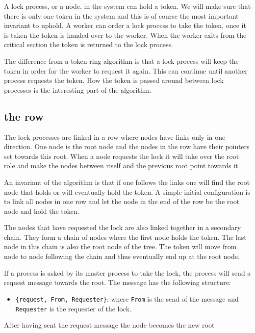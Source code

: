 \documentclass[a4paper, 11pt]{article}
\begin{document}
A lock process, or a node, in the system can hold a token. We will
make sure that there is only one token in the system and this is of
course the most important invariant to uphold. A worker can order a
lock process to take the token, once it is taken the token is handed
over to the worker. When the worker exits from the critical section
the token is returned to the lock process. 

The difference from a token-ring algorithm is that a lock process will
keep the token in order for the worker to request it again. This can
continue until another process requests the token. How the token is
passed around between lock processes is the interesting part of the
algorithm.

\subsection{the row}

The lock processes are linked in a row where nodes have links only in
one direction. One node is the root node and the nodes in the row have
their pointers set towards this root. When a node requests the lock it
will take over the root role and make the nodes between itself and
the previous root point towards it. 

An invariant of the algorithm is that if one follows the links one will 
find the root node that holds or will eventually hold the
token. A simple initial configuration is to link all nodes in one row
and let the node in the end of the row be the root node and hold the token.

The nodes that have requested the lock are also linked together in a
secondary chain. They form a chain of nodes where the first node holds
the token. The last node in this chain is also the root node of the
tree. The token will move from node to node following the chain and
thus eventually end up at the root node.

If a process is asked by its master process to take the lock, the process
will send a request message towards the root. The message has the
following structure:

\begin{itemize}
\item {\tt \{request, From, Requester\}}: where {\tt From} is the send
  of the message and {\tt Requester} is the requester of the lock.
\end{itemize}

After having sent the request message the node becomes the new root 
\end{document}
